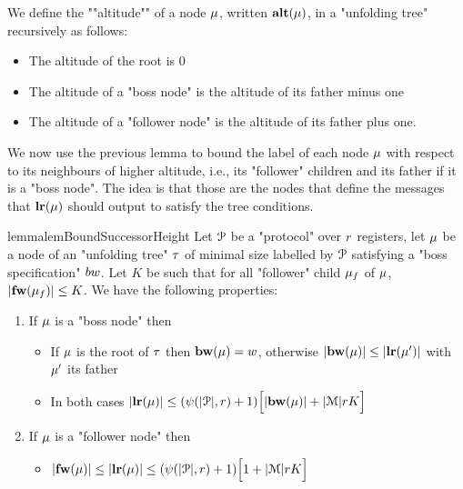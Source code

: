\begin{definition}
	We define the ""altitude"" of a node $\mu$, written $\mathbf{alt}(\mu)$, in a "unfolding tree" recursively as follows:
	\begin{itemize}
		\item The altitude of the root is $0$
		
		\item The altitude of a "boss node" is the altitude of its father minus one
		
		\item The altitude of a "follower node" is the altitude of its father plus one.
	\end{itemize}
\end{definition}

We now use the previous lemma to bound the label of each node $\mu$ with respect to its neighbours of higher altitude, i.e., its "follower" children and its father if it is a "boss node". The idea is that those are the nodes that define the messages that $\mathbf{lr}(\mu)$ should output to satisfy the tree conditions.

\begin{restatable}{lemma}{lemBoundSuccessorHeight}
	\label{lem:bound-successor-height}
	Let $\mathcal{P}$ be a "protocol" over $r$ registers, let $\mu$ be a node of an "unfolding tree" $\tau$ of minimal size labelled by $\mathcal{P}$ satisfying a "boss specification" $\bossspec$.
	Let $K$ be such that for all "follower" child $\mu_f$ of $\mu$, $|\mathbf{fw}(\mu_f)| \leq K$.
	We have the following properties:
	
	\begin{enumerate}				
		\item  If $\mu$ is a "boss node" then 
		\begin{itemize}
			\item If $\mu$ is the root of $\tau$ then $\mathbf{bw}(\mu) = w$, otherwise $|\mathbf{bw}(\mu)| \leq |\mathbf{lr}(\mu')|$ with $\mu'$ its father
			
			\item In both cases $|\mathbf{lr}(\mu)| \leq (\psi(|\mathcal{P}|,r) + 1)\Big[ |\mathbf{bw}(\mu)| + |\mathcal{M}|rK \Big]$
		\end{itemize}
		
		\item If $\mu$ is a "follower node" then 
		\begin{itemize}			
			\item $|\mathbf{fw}(\mu)| \leq |\mathbf{lr}(\mu)| \leq (\psi(|\mathcal{P}|,r) +1)\Big[ 1 + |\mathcal{M}|rK \Big]$
			
		\end{itemize}
	\end{enumerate}
\end{restatable}


